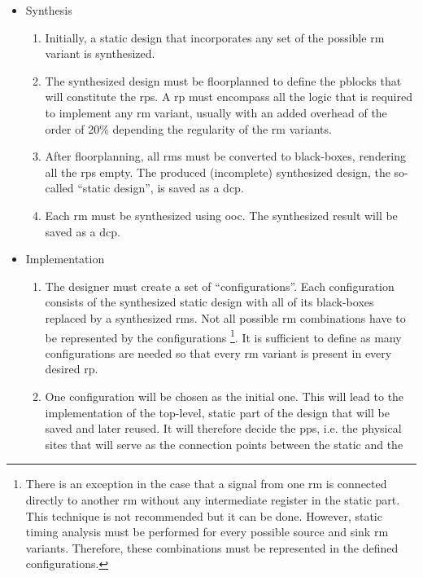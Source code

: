 \begin{itemize}
\item	Synthesis
	\begin{enumerate}
	\item	Initially, a static design that incorporates any set of the possible 
		\gls{rm} variant is synthesized.
	\item	The synthesized design must be floorplanned to define the \glspl{pblock} that
		will constitute the \glspl{rp}. A \gls{rp} must encompass all the logic that is required
		to implement any \gls{rm} variant, usually with an added overhead of the order of 20\%
		depending the regularity of the \gls{rm} variants.
	\item	After floorplanning, all \glspl{rm} must be converted to black-boxes, 
		rendering all the \glspl{rp} empty. The produced (incomplete) synthesized design,
		the so-called ``static design'', is saved as a \gls{dcp}.
	\item	Each \gls{rm} must be synthesized using \gls{ooc}. 
		The synthesized result will be saved as a \gls{dcp}.
	\end{enumerate}
\item	Implementation
	\begin{enumerate}
	\item	The designer must create a set of ``configurations''. 
		Each configuration consists of the synthesized static design 
		with all of its black-boxes replaced by a synthesized \glspl{rm}.
		Not all possible \gls{rm} combinations have to be represented by the configurations
		\footnote{
			There is an exception in the case that a signal from one \gls{rm}
			is connected directly to another \gls{rm} without any 
			intermediate register in the static part.
			This technique is not recommended but it can be done. 
			However, static timing analysis must be performed for every possible
			source and sink \gls{rm} variants.
			Therefore, these combinations must be represented in the defined configurations.
		}.
		It is sufficient to define as many configurations are needed so that
		every \gls{rm} variant is present in every desired \gls{rp}.
	\item	One configuration will be chosen as the initial one.
		This will lead to the implementation of the top-level,
		static part of the design that will be saved and later reused.
		It will therefore decide the \glspl{pp}, i.e. the physical
		sites that will serve as the connection points between the static and the

\end{enumerate}
\end{itemize}
